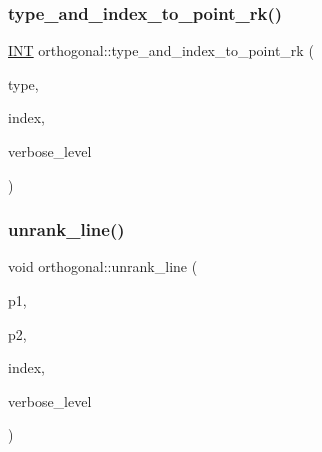 \subsubsection{\texorpdfstring{type\+\_\+and\+\_\+index\+\_\+to\+\_\+point\+\_\+rk()}{type\_and\_index\_to\_point\_rk()}}
{\footnotesize\ttfamily \mbox{\hyperlink{galois_8h_a09fddde158a3a20bd2dcadb609de11dc}{I\+NT}} orthogonal\+::type\+\_\+and\+\_\+index\+\_\+to\+\_\+point\+\_\+rk (\begin{DoxyParamCaption}\item[{\mbox{\hyperlink{galois_8h_a09fddde158a3a20bd2dcadb609de11dc}{I\+NT}}}]{type,  }\item[{\mbox{\hyperlink{galois_8h_a09fddde158a3a20bd2dcadb609de11dc}{I\+NT}}}]{index,  }\item[{\mbox{\hyperlink{galois_8h_a09fddde158a3a20bd2dcadb609de11dc}{I\+NT}}}]{verbose\+\_\+level }\end{DoxyParamCaption})}

\mbox{\label{classorthogonal_a27fec576f6e11b80dd4503fa3cf7611e}} 
\subsubsection{\texorpdfstring{unrank\+\_\+line()}{unrank\_line()}}
{\footnotesize\ttfamily void orthogonal\+::unrank\+\_\+line (\begin{DoxyParamCaption}\item[{\mbox{\hyperlink{galois_8h_a09fddde158a3a20bd2dcadb609de11dc}{I\+NT}} \&}]{p1,  }\item[{\mbox{\hyperlink{galois_8h_a09fddde158a3a20bd2dcadb609de11dc}{I\+NT}} \&}]{p2,  }\item[{\mbox{\hyperlink{galois_8h_a09fddde158a3a20bd2dcadb609de11dc}{I\+NT}}}]{index,  }\item[{\mbox{\hyperlink{galois_8h_a09fddde158a3a20bd2dcadb609de11dc}{I\+NT}}}]{verbose\+\_\+level }\end{DoxyParamCaption})}

\mbox{\label{classorthogonal_aca204928ad9c6c2d9e9afe2ea5af6d60}} 
